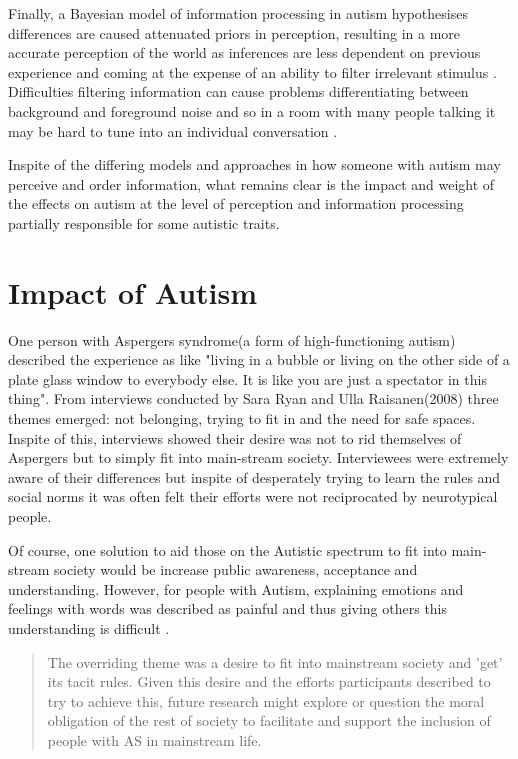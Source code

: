 \documentclass[11pt]{report}
\begin{document}
Finally, a Bayesian model of information processing in autism hypothesises differences are caused attenuated priors in perception, resulting in a more accurate perception of the world as inferences are less dependent on previous experience and coming at the expense of an ability to filter irrelevant stimulus \cite{bayes}. Difficulties filtering information can cause problems differentiating between background and foreground noise and so in a room with many people talking it may be hard to tune into an individual conversation \cite{bayes}. 

Inspite of the differing models and approaches in how someone with autism may perceive and order information, what remains clear is the impact and weight of the effects on autism at the level of perception and information processing partially responsible for some autistic traits. 

\section{Impact of Autism}
One person with Aspergers syndrome(a form of high-functioning autism) described the experience as like "living in a bubble or living on the other side of a plate glass window to everybody else. It is like you are just a spectator in this thing"\cite{aspieway}. From interviews conducted by Sara Ryan and Ulla Raisanen(2008) three themes emerged: not belonging, trying to fit in and the need for safe spaces. Inspite of this, interviews showed their desire was not to rid themselves of Aspergers but to simply fit into main-stream society. Interviewees were extremely aware of their differences but inspite of desperately trying to learn the rules and social norms it was often felt their efforts were not reciprocated by neurotypical people.

Of course, one solution to aid those on the Autistic spectrum to fit into main-stream society would be increase public awareness, acceptance and understanding. However, for people with Autism, explaining emotions and feelings with words was described as painful and thus giving others this understanding is difficult \cite{aspieway}. 

\begin{quote}
The overriding theme was a desire to fit into mainstream society and 'get' its tacit rules. Given this desire and the
efforts participants described to try to achieve this, future research might explore or question the moral obligation of the rest of society to facilitate and support the inclusion of people with AS in mainstream life. \cite{aspieway}
\end{quote}
\end{document}

